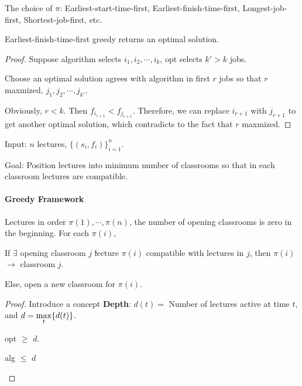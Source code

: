 The choice of $ \pi $: Earliest-start-time-first, Earliest-finish-time-first, Longest-job-first, Shortest-job-first, etc.
\begin{theorem}
    Earliest-finish-time-first greedy returns an optimal solution.
\end{theorem}
\begin{proof}
    Suppose algorithm selects  $ i_1,i_2,\cdots,i_k $, opt selects  $ k'>k $ jobs.
    
    Choose an optimal solution agrees with algorithm in first  $ r $ jobs so that  $ r  $ maxmized,  $ j_1,j_2,\cdots,j_{k'} $.

    Obviously,  $ r<k $. Then  $ f_{i_{r+1}}<f_{j_{r+1}} $. Therefore, we can replace  $ i_{r+1} $ with  $ j_{r+1} $ to get another optimal solution, which contradicts to the fact that  $ r $ maxmized.
\end{proof}

\begin{example}
    Input:  $ n $  lectures,  $ \{(s_i,f_i)\}_{i=1}^n $.
    
    Goal: Position lectures into minimum number of  classrooms so that in each classroom lectures are compatible.
\end{example}
\paragraph{Greedy Framework} Lectures in order  $ \pi(1),\cdots,\pi(n) $, the number of  opening classrooms is zero in the beginning. For each  $ \pi(i) $,

If  $ \exists $ opening classroom  $ j $ \st lecture  $ \pi(i) $ compatible with lectures in  $ j $, then  $ \pi(i) $ $ \rightarrow $ classroom  $ j $.

Else, open a new classroom for  $ \pi(i) $. 

\begin{proof}
    Introduce a concept \textbf{Depth}:  $ d(t)=  $ Number of lectures active at time  $ t $, and  $ d=\displaystyle\max_{t}\{d(t)\} $.
    \begin{claim}
        opt $ \geq  $  $ d $.  
    \end{claim}   
    \begin{lemma}
        alg  $ \leq  $ $ d $  
    \end{lemma}
\end{proof}